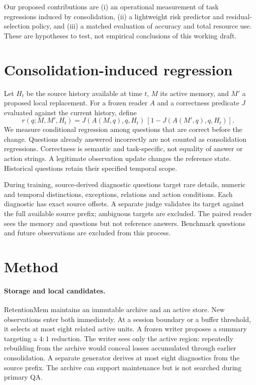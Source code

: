 \documentclass[11pt]{article}
\newcommand{\method}{RetentionMem}
\begin{document}
Our proposed contributions are (i) an operational measurement of task regressions
induced by consolidation, (ii) a lightweight risk predictor and residual-selection
policy, and (iii) a matched evaluation of accuracy and total resource use. These
are hypotheses to test, not empirical conclusions of this working draft.

\section{Consolidation-induced regression}
Let $H_t$ be the source history available at time $t$, $M$ its active memory, and
$M'$ a proposed local replacement. For a frozen reader $A$ and a correctness
predicate $J$ evaluated against the current history, define
\begin{equation}
r(q;M,M',H_t)=J(A(M,q),q,H_t)\,[1-J(A(M',q),q,H_t)].
\end{equation}
We measure conditional regression among questions that are correct before the
change. Questions already answered incorrectly are not counted as consolidation
regressions. Correctness is semantic and task-specific, not equality of answer or
action strings. A legitimate observation update changes the reference state.
Historical questions retain their specified temporal scope.

During training, source-derived diagnostic questions target rare details,
numeric and temporal distinctions, exceptions, relations and action conditions.
Each diagnostic has exact source offsets. A separate judge validates its target
against the full available source prefix; ambiguous targets are excluded. The
paired reader sees the memory and questions but not reference answers. Benchmark
questions and future observations are excluded from this process.

\section{Method}
\paragraph{Storage and local candidates.}
\method{} maintains an immutable archive and an active store. New observations
enter both immediately. At a session boundary or a buffer threshold, it selects
at most eight related active units. A frozen writer proposes a summary targeting
a $4{:}1$ reduction. The writer sees only the active region: repeatedly rebuilding
from the archive would conceal losses accumulated through earlier consolidation.
A separate generator derives at most eight diagnostics from the source prefix.
The archive can support maintenance but is not searched during primary QA.
\end{document}
